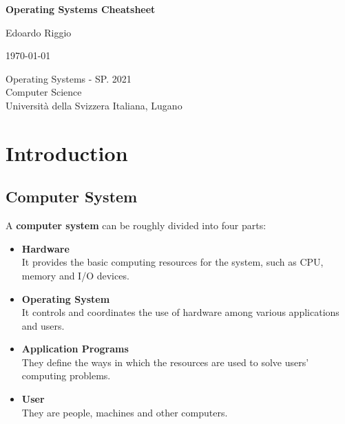 \documentclass{article}
\begin{document}
\begin{titlepage}
    \begin{center}
        \vspace*{1cm}
        
        \Huge
        \textbf{Operating Systems Cheatsheet}
        
        \vspace{0.5cm}
        \LARGE
        
        \vspace{.5cm}
        
        Edoardo Riggio
   		  \vspace{1.5cm}
       
        \vfill
        
        \today
        
        \vspace{.8cm}
          \Large
          Operating Systems - SP. 2021 \\
        Computer Science\\
        Universit\`{a} della Svizzera Italiana, Lugano\\
        
    \end{center}
\end{titlepage}

\tableofcontents

\newpage

\section{Introduction}
\subsection{Computer System}
A \textbf{computer system} can be roughly divided into four parts:

\begin{itemize}
	\item \textbf{Hardware}
	\vspace{.2cm} \\
	It provides the basic computing resources for the system, such as CPU, memory and I/O devices.
	
	\item \textbf{Operating System}
	\vspace{.2cm} \\
	It controls and coordinates the use of hardware among various applications and users.
	
	\item \textbf{Application Programs}
	\vspace{.2cm} \\
	They define the ways in which the resources are used to solve users' computing problems.
	
	\item \textbf{User}
	\vspace{.2cm} \\
	They are people, machines and other computers.
\end{itemize}
\end{document}
